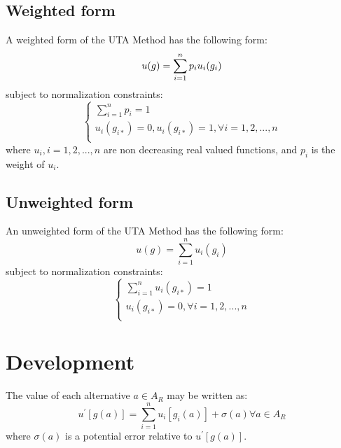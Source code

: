\documentclass{report}
\begin{document}
\subsection{Weighted form}
A weighted form of the UTA Method has the following form: 
\begin{equation}
	u(g) = \sum_{i=1}^{n} p_i u_i (g_i)\\
\end{equation}
subject to normalization constraints:\\
\begin{equation}
      \begin{cases}
      	\sum_{i=1}^{n} p_i = 1 \\
      	u_i(g_{i*}) = 0, u_i(g_{i*}) = 1,  \forall i = 1, 2, ..., n\\
      \end{cases}
\end{equation}
where $ u_i, i = 1,2,...,n$ are non decreasing real valued functions, and $p_i$ is the weight of $u_i$.\\

\subsection{Unweighted form}
An unweighted form of the UTA Method has the following form: 
\begin{equation}\label{eq1}
      u(g) = \sum_{i=1}^{n} u_i (g_i)
\end{equation}
subject to normalization constraints:\\
\begin{equation}\label{eq2}
      \begin{cases}
      	\sum_{i=1}^{n} u_i(g_{i*}) = 1\\
       	u_i(g_{i*}) = 0,  \forall i = 1, 2, ..., n\\
      \end{cases}
\end{equation}

\section{Development}
The value of each alternative $a \in A_R $ may be written as:
\begin{equation}
	u^{'} [g(a)] = \sum_{i=1}^{n} u_i [g_i (a)] + \sigma (a)   \forall a \in A_R
\end{equation}
where $\sigma (a)$ is a potential error relative to $u^{'} [g(a)]$.\\
\end{document}
